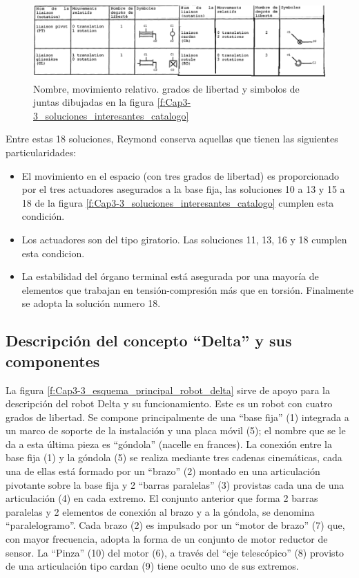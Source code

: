       \begin{figure}[htb]
        \centering
        \includegraphics[width=0.8\linewidth]{Main/Chapter4/Images4/juntas.png}
        \caption{Nombre, movimiento relativo. grados de libertad y simbolos de juntas dibujadas en la figura  \ref{f:Cap3-3_soluciones_interesantes_catalogo}  \cite{Clavel:31403}}
        \label{f:Cap3-3_soluciones_interesantes_catalogo_JUNTAS}
    \end{figure}
 
 Entre estas 18 soluciones, Reymond conserva aquellas que tienen las siguientes particularidades:   
    \begin{itemize}
        \item El movimiento en el espacio (con tres grados de libertad) es proporcionado por el tres actuadores asegurados a la base fija, las soluciones 10 a 13 y 15 a 18 de la figura \ref{f:Cap3-3_soluciones_interesantes_catalogo} cumplen esta condición.
        \item Los actuadores son del tipo giratorio. Las soluciones 11, 13, 16 y 18 cumplen esta condicion.
        \item La estabilidad del órgano terminal está asegurada por una mayoría de elementos que trabajan en tensión-compresión más que en torsión. Finalmente se adopta la solución numero 18.
    \end{itemize}
    

    
        \newpage
    
    \subsection{Descripción del concepto ``Delta'' y sus componentes}
    La figura \ref{f:Cap3-3_esquema_principal_robot_delta} sirve de apoyo para la descripción del robot Delta y su funcionamiento. Este es un robot con cuatro grados de libertad. Se compone principalmente de una ``base fija'' (1) integrada a un marco de soporte de la instalación y una placa móvil (5); el nombre que se le da a esta última pieza es ``góndola'' (nacelle en frances). La conexión entre la base fija (1) y la góndola (5) se realiza mediante tres cadenas cinemáticas, cada una de ellas está formado por un ``brazo'' (2) montado en una articulación pivotante sobre la base fija y 2 ``barras paralelas'' (3) provistas cada una de una articulación (4) en cada extremo. El conjunto anterior que forma 2 barras paralelas y 2 elementos de conexión al brazo y a la góndola, se denomina ``paralelogramo''. Cada brazo (2) es impulsado por un ``motor de brazo'' (7) que, con mayor frecuencia, adopta la forma de un conjunto de motor reductor de sensor. La ``Pinza'' (10) del motor (6), a través del ``eje telescópico'' (8) provisto de una articulación tipo cardan (9) tiene oculto uno de sus extremos.

